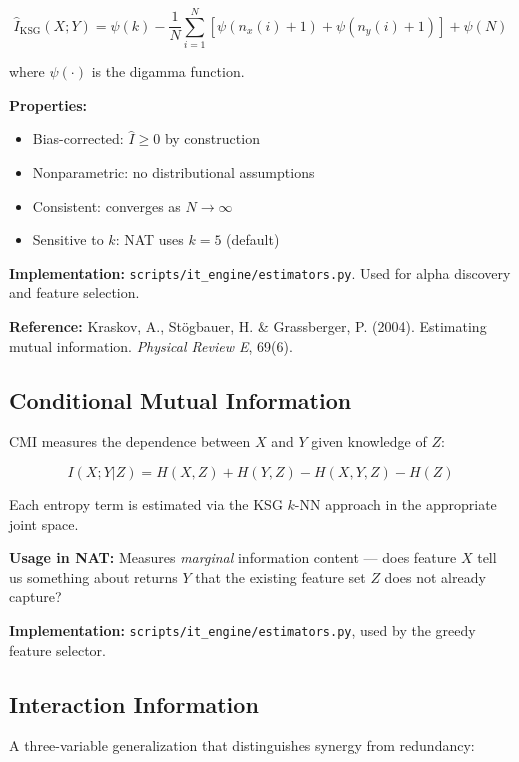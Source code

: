 \documentclass[11pt,a4paper]{article}
\begin{document}
\begin{equation}
\hat{I}_{\text{KSG}}(X; Y) = \psi(k) - \frac{1}{N}\sum_{i=1}^{N}\left[\psi(n_x(i) + 1) + \psi(n_y(i) + 1)\right] + \psi(N)
\end{equation}

where $\psi(\cdot)$ is the digamma function.

\textbf{Properties:}
\begin{itemize}
    \item Bias-corrected: $\hat{I} \geq 0$ by construction
    \item Nonparametric: no distributional assumptions
    \item Consistent: converges as $N \to \infty$
    \item Sensitive to $k$: NAT uses $k = 5$ (default)
\end{itemize}

\textbf{Implementation:} \texttt{scripts/it\_engine/estimators.py}. Used for alpha discovery and feature selection.

\textbf{Reference:} Kraskov, A., St\"ogbauer, H. \& Grassberger, P. (2004). Estimating mutual information. \textit{Physical Review E}, 69(6).

\subsection{Conditional Mutual Information}

CMI measures the dependence between $X$ and $Y$ given knowledge of $Z$:

\begin{equation}
I(X; Y | Z) = H(X, Z) + H(Y, Z) - H(X, Y, Z) - H(Z)
\end{equation}

Each entropy term is estimated via the KSG $k$-NN approach in the appropriate joint space.

\textbf{Usage in NAT:} Measures \textit{marginal} information content --- does feature $X$ tell us something about returns $Y$ that the existing feature set $Z$ does not already capture?

\textbf{Implementation:} \texttt{scripts/it\_engine/estimators.py}, used by the greedy feature selector.

\subsection{Interaction Information}

A three-variable generalization that distinguishes synergy from redundancy:
\end{document}
